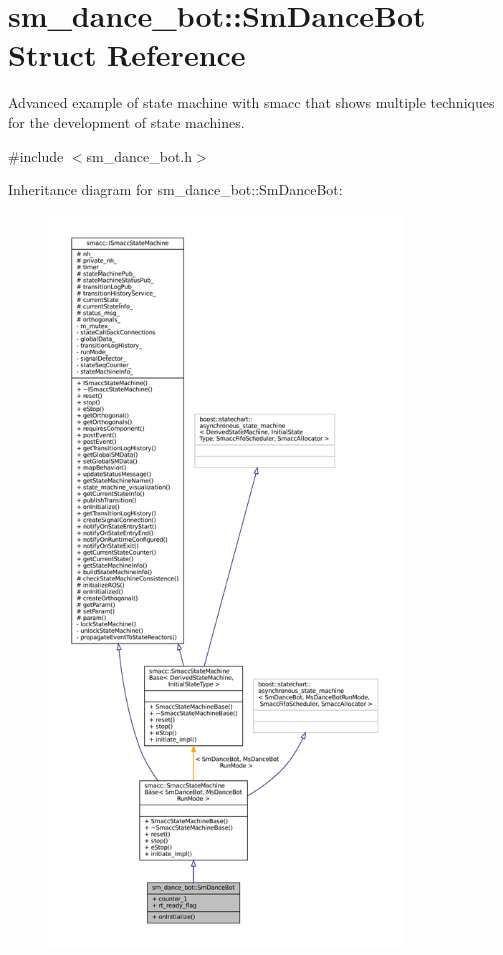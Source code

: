 \hypertarget{structsm__dance__bot_1_1SmDanceBot}{}\section{sm\+\_\+dance\+\_\+bot\+:\+:Sm\+Dance\+Bot Struct Reference}
\label{structsm__dance__bot_1_1SmDanceBot}


Advanced example of state machine with smacc that shows multiple techniques for the development of state machines.  




{\ttfamily \#include $<$sm\+\_\+dance\+\_\+bot.\+h$>$}



Inheritance diagram for sm\+\_\+dance\+\_\+bot\+:\+:Sm\+Dance\+Bot\+:
\nopagebreak
\begin{figure}[H]
\begin{center}
\leavevmode
\includegraphics[height=550pt]{structsm__dance__bot_1_1SmDanceBot__inherit__graph}
\end{center}
\end{figure}


